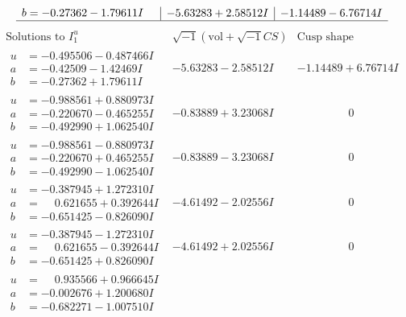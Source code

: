 \documentclass[1p]{elsarticle_modified}
\theoremstyle{definition}
\newcommand{\I}{\sqrt{-1}}
\begin{document}
$$\begin{array}{c|c|c}
\begin{aligned}
b &= -0.27362 - 1.79611 I\end{aligned}
 & -5.63283 + 2.58512 I & -1.14489 - 6.76714 I\\
 \hline 
 \end{array}$$\newpage$$\begin{array}{c|c|c}  
\text{Solutions to }I^u_{1}& \I (\text{vol} + \sqrt{-1}CS) & \text{Cusp shape}\\
 \hline 
\begin{aligned}
u &= -0.495506 - 0.487466 I \\
a &= -0.42509 - 1.42469 I \\
b &= -0.27362 + 1.79611 I\end{aligned}
 & -5.63283 - 2.58512 I & -1.14489 + 6.76714 I \\ \hline\begin{aligned}
u &= -0.988561 + 0.880973 I \\
a &= -0.220670 - 0.465255 I \\
b &= -0.492990 + 1.062540 I\end{aligned}
 & -0.83889 + 3.23068 I & \phantom{-0.000000 } 0 \\ \hline\begin{aligned}
u &= -0.988561 - 0.880973 I \\
a &= -0.220670 + 0.465255 I \\
b &= -0.492990 - 1.062540 I\end{aligned}
 & -0.83889 - 3.23068 I & \phantom{-0.000000 } 0 \\ \hline\begin{aligned}
u &= -0.387945 + 1.272310 I \\
a &= \phantom{-}0.621655 + 0.392644 I \\
b &= -0.651425 - 0.826090 I\end{aligned}
 & -4.61492 - 2.02556 I & \phantom{-0.000000 } 0 \\ \hline\begin{aligned}
u &= -0.387945 - 1.272310 I \\
a &= \phantom{-}0.621655 - 0.392644 I \\
b &= -0.651425 + 0.826090 I\end{aligned}
 & -4.61492 + 2.02556 I & \phantom{-0.000000 } 0 \\ \hline\begin{aligned}
u &= \phantom{-}0.935566 + 0.966645 I \\
a &= -0.002676 + 1.200680 I \\
b &= -0.682271 - 1.007510 I\end{aligned}

\end{array}$$
\end{document}
